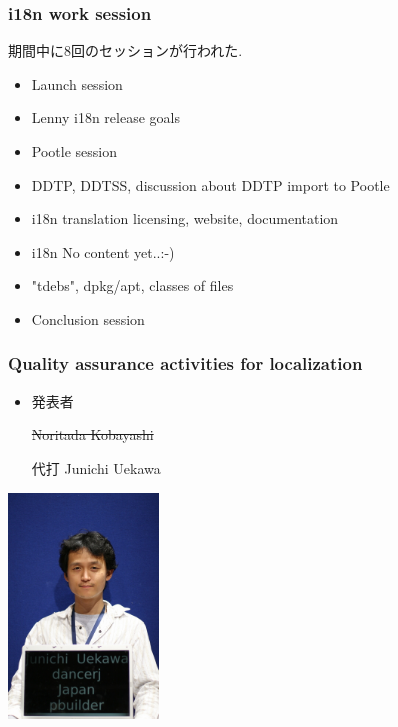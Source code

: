 \documentclass[cjk,dvipdfmx,12pt]{beamer}
\begin{document}
\begin{frame}
\frametitle{i18n work session} 
期間中に8回のセッションが行われた.

  \begin{itemize}
     \item Launch session
     \item Lenny i18n release goals
     \item Pootle session
     \item DDTP, DDTSS, discussion about DDTP import to Pootle
     \item i18n  translation licensing, website, documentation
     \item i18n No content yet..:-)
     \item "tdebs", dpkg/apt, classes of files
     \item Conclusion session    
    
  \end{itemize}
\end{frame}

\begin{frame}
\frametitle{Quality assurance activities for localization} 
  \begin{minipage}{0.4\hsize}
    \begin{itemize}
      \item 発表者

	\sout{Noritada Kobayashi}

        代打 Junichi Uekawa
    \end{itemize}
  \end{minipage}
  \begin{minipage}{0.4\hsize}
    \includegraphics[width=4cm]{image200707/dancerj.jpg}  
  \end{minipage}
\end{frame}
\end{document}
